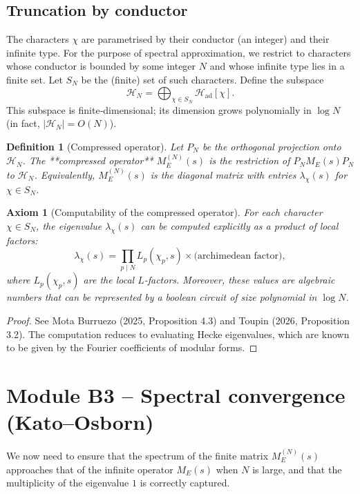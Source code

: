 \documentclass[11pt,a4paper]{article}
\newtheorem{definition}[theorem]{Definition}
\newtheorem{axiom}{Axiom}[section]
\begin{document}
\subsection{Truncation by conductor}

The characters \(\chi\) are parametrised by their conductor (an integer) and their infinite type. For the purpose of spectral approximation, we restrict to characters whose conductor is bounded by some integer \(N\) and whose infinite type lies in a finite set. Let \(S_N\) be the (finite) set of such characters. Define the subspace
\[
\mathcal{H}_N = \bigoplus_{\chi \in S_N} \mathcal{H}_{\text{ad}}[\chi].
\]
This subspace is finite‑dimensional; its dimension grows polynomially in \(\log N\) (in fact, \(|\mathcal{H}_N| = O(N)\)).

\begin{definition}[Compressed operator]
Let \(P_N\) be the orthogonal projection onto \(\mathcal{H}_N\). The **compressed operator** \(M_E^{(N)}(s)\) is the restriction of \(P_N M_E(s) P_N\) to \(\mathcal{H}_N\). Equivalently, \(M_E^{(N)}(s)\) is the diagonal matrix with entries \(\lambda_\chi(s)\) for \(\chi \in S_N\).
\end{definition}

\begin{axiom}[Computability of the compressed operator]
For each character \(\chi \in S_N\), the eigenvalue \(\lambda_\chi(s)\) can be computed explicitly as a product of local factors:
\[
\lambda_\chi(s) = \prod_{p \mid N} L_p(\chi_p, s) \times \text{(archimedean factor)},
\]
where \(L_p(\chi_p, s)\) are the local \(L\)-factors. Moreover, these values are algebraic numbers that can be represented by a boolean circuit of size polynomial in \(\log N\).
\end{axiom}
\begin{proof}
See Mota Burruezo (2025, Proposition 4.3) and Toupin (2026, Proposition 3.2). The computation reduces to evaluating Hecke eigenvalues, which are known to be given by the Fourier coefficients of modular forms.
\end{proof}

\section{Module B3 – Spectral convergence (Kato–Osborn)}

We now need to ensure that the spectrum of the finite matrix \(M_E^{(N)}(s)\) approaches that of the infinite operator \(M_E(s)\) when \(N\) is large, and that the multiplicity of the eigenvalue \(1\) is correctly captured.
\end{document}
